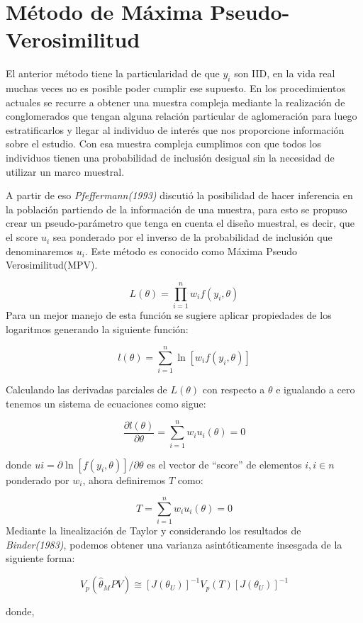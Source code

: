 \documentclass[
  12pt,
]{book}
\begin{document}
\section{Método de Máxima Pseudo-Verosimilitud}\label{muxe9todo-de-muxe1xima-pseudo-verosimilitud}

El anterior método tiene la particularidad de que \(y_{i}\) son IID, en la vida real muchas veces no es posible poder cumplir ese supuesto. En los procedimientos actuales se recurre a obtener una muestra compleja mediante la realización de conglomerados que tengan alguna relación particular de aglomeración para luego estratificarlos y llegar al individuo de interés que nos proporcione información sobre el estudio. Con esa muestra compleja cumplimos con que todos los individuos tienen una probabilidad de inclusión desigual sin la necesidad de utilizar un marco muestral.

A partir de eso \emph{Pfeffermann(1993)} discutió la posibilidad de hacer inferencia en la población partiendo de la información de una muestra, para esto se propuso crear un pseudo-parámetro que tenga en cuenta el diseño muestral, es decir, que el score \(u_{i}\) sea ponderado por el inverso de la probabilidad de inclusión que denominaremos \(u_{i}\). Este método es conocido como Máxima Pseudo Verosimilitud(MPV).

\[
L(\theta)=\prod_{i=1}^{n}w_{i}f(y_{i},\theta)
\]
Para un mejor manejo de esta función se sugiere aplicar propiedades de los logaritmos generando la siguiente función:

\[
l(\theta)=\sum_{i=1}^{n}\ln[w_{i}f(y_{i},\theta)]
\]

Calculando las derivadas parciales de \(L(\theta)\) con respecto a \(\theta\) e igualando a cero tenemos un sistema de ecuaciones como sigue:

\[
\dfrac{\partial l(\theta)}{\partial\theta}=\sum_{i=1}^{n}w_{i}u_{i}(\theta)=0
\]

donde \(ui=\partial\ln[f(y_{i},\theta)]/\partial\theta\) es el vector de ``score'' de elementos \(i,i\in n\) ponderado por \(w_{i}\), ahora definiremos \(T\) como:

\[
T=\sum_{i=1}^{n}w_{i}u_{i}(\theta)=0
\]
Mediante la linealización de Taylor y considerando los resultados de \emph{Binder(1983)}, podemos obtener una varianza asintóticamente insesgada de la siguiente forma:

\[
V_{p}(\hat{\theta}_{M}PV)\cong[J(\theta_{U})]^{-1}V_{p}(T)[J(\theta_{U})]^{-1}
\]

donde,
\end{document}
